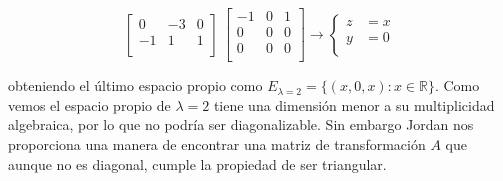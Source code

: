 \begin{example}
\begin{equation*}
\begin{bmatrix}
        0 & -3 & 0\\
        -1 & 1 & 1\\
        \end{bmatrix}
        ~ \begin{bmatrix}
        -1 & 0 & 1\\
        0 & 0 & 0\\
        0 & 0 & 0\\
        \end{bmatrix}
        \rightarrow 
        \begin{cases}
            z &= x \\
            y &= 0 \\
        \end{cases}
    \end{equation*}

    obteniendo el último espacio propio como \( E_{\lambda=2}  = \{(x,0,x): x \in \mathbb{R}  \}\).
    Como vemos el espacio propio de \(\lambda = 2\) tiene una dimensión menor a su multiplicidad algebraica, por lo que 
    no podría ser diagonalizable. Sin embargo Jordan nos proporciona una manera de encontrar una matriz de transformación \(A\) que 
    aunque no es diagonal, cumple la propiedad de ser triangular.


\end{example}
